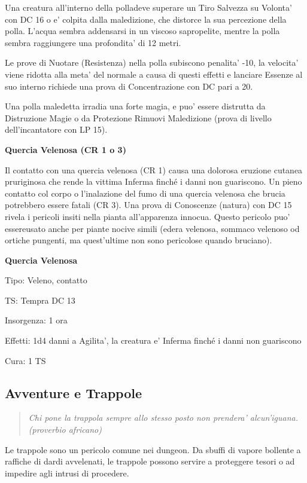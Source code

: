 \documentclass[a4paper,11pt,twoside,openany]{book}
\begin{document}
Una creatura all'interno della polladeve superare un Tiro Salvezza su Volonta' con DC 16 o e' colpita dalla maledizione, che distorce la sua percezione della polla. L'acqua sembra addensarsi in un viscoso sapropelite, mentre la polla sembra raggiungere una profondita' di 12 metri.

Le prove di Nuotare (Resistenza) nella polla subiscono penalita' -10, la velocita' viene ridotta alla meta' del normale a causa di questi effetti e lanciare Essenze al suo interno richiede una prova di Concentrazione con DC pari a 20.

Una polla maledetta irradia una forte magia, e puo' essere distrutta da Distruzione Magie o da Protezione Rimuovi Maledizione (prova di livello dell'incantatore
con LP 15).

\textbf{Quercia Velenosa (CR 1 o 3)}

Il contatto con una quercia velenosa (CR 1) causa una dolorosa eruzione cutanea pruriginosa che rende la vittima Inferma finché i danni non guariscono. Un pieno contatto col corpo o l'inalazione del fumo di una quercia velenosa che brucia potrebbero essere fatali (CR 3). Una prova di Conoscenze (natura) con DC 15 rivela i pericoli insiti nella pianta all'apparenza innocua. Questo pericolo puo' essereusato anche per piante nocive simili (edera velenosa, sommaco velenoso od ortiche pungenti, ma quest'ultime non sono pericolose quando bruciano).

\textbf{Quercia Velenosa}

Tipo: Veleno, contatto

TS: Tempra DC 13

Insorgenza: 1 ora

Effetti: 1d4 danni a Agilita', la creatura e' Inferma finché i danni
non guariscono

Cura: 1 TS

\pagebreak

\subsection{Avventure e Trappole}

\label{avventure-e-trappole}
\begin{quote}\textit{
Chi pone la trappola sempre allo stesso posto non prendera' alcun'iguana. (proverbio africano)
}\end{quote}

Le trappole sono un pericolo comune nei dungeon. Da sbuffi di vapore bollente a raffiche di dardi avvelenati, le trappole possono servire a proteggere tesori o ad impedire agli intrusi di procedere. 
\end{document}
